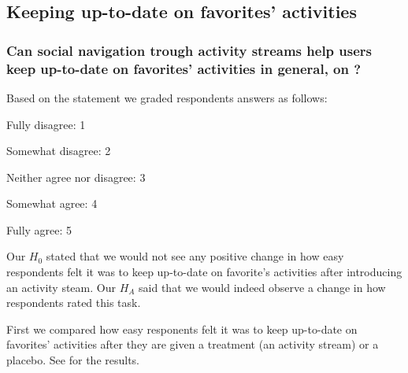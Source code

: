 \subsection{Keeping up-to-date on favorites' activities}

\subsubsection{%
  Can social navigation trough activity streams help users keep
  up-to-date on favorites' activities in general, on \urort{}?
}

Based on the statement
 we graded respondents answers as follows: 

\begin{items}
  \item Fully disagree: 1
  \item Somewhat disagree: 2
  \item Neither agree nor disagree: 3
  \item Somewhat agree: 4
  \item Fully agree: 5
\end{items}

Our $H_0$ stated that we would not see any positive change in how easy
respondents felt it was to keep up-to-date on favorite's activities
after introducing an activity steam. Our $H_A$ said that we
would indeed observe a change in how respondents rated this task.

First we compared how easy responents felt it was to keep up-to-date on
favorites' activities after they are given a treatment (an activity stream)
or a placebo.
See
 for the results.

\newcommand{\twoguides}{%
  \begin{tikzpicture}
    \draw (-1,1) -- (-1,1);
    \begin{scope}[color=red]
      \draw (-1,0.75) -- (-0.25,0.5);
      \draw (-1,0.2) -- (-0.25,0.5);
    \end{scope}
  \end{tikzpicture}}

